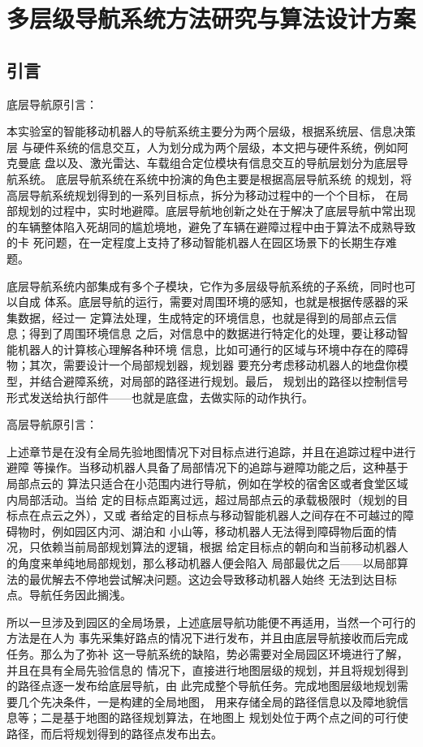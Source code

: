 \chapter{多层级导航系统方法研究与算法设计方案}

\section{引言}

底层导航原引言：

本实验室的智能移动机器人的导航系统主要分为两个层级，根据系统层、信息决策层
与硬件系统的信息交互，人为划分成为两个层级，本文把与硬件系统，例如阿克曼底
盘以及、激光雷达、车载组合定位模块有信息交互的导航层划分为底层导航系统。
底层导航系统在系统中扮演的角色主要是根据高层导航系统
的规划，将高层导航系统规划得到的一系列目标点，拆分为移动过程中的一个个目标，
在局部规划的过程中，实时地避障。底层导航地创新之处在于解决了底层导航中常出现
的车辆整体陷入死胡同的尴尬境地，避免了车辆在避障过程中由于算法不成熟导致的卡
死问题，在一定程度上支持了移动智能机器人在园区场景下的长期生存难题。

底层导航系统内部集成有多个子模块，它作为多层级导航系统的子系统，同时也可以自成
体系。底层导航的运行，需要对周围环境的感知，也就是根据传感器的采集数据，经过一
定算法处理，生成特定的环境信息，也就是得到的局部点云信息；得到了周围环境信息
之后，对信息中的数据进行特定化的处理，要让移动智能机器人的计算核心理解各种环境
信息，比如可通行的区域与环境中存在的障碍物；其次，需要设计一个局部规划器，规划器
要充分考虑移动机器人的地盘你模型，并结合避障系统，对局部的路径进行规划。最后，
规划出的路径以控制信号形式发送给执行部件——也就是底盘，去做实际的动作执行。


高层导航原引言：

上述章节是在没有全局先验地图情况下对目标点进行追踪，并且在追踪过程中进行避障
等操作。当移动机器人具备了局部情况下的追踪与避障功能之后，这种基于局部点云的
算法只适合在小范围内进行导航，例如在学校的宿舍区或者食堂区域内局部活动。当给
定的目标点距离过远，超过局部点云的承载极限时（规划的目标点在点云之外），又或
者给定的目标点与移动智能机器人之间存在不可越过的障碍物时，例如园区内河、湖泊和
小山等，移动机器人无法得到障碍物后面的情况，只依赖当前局部规划算法的逻辑，根据
给定目标点的朝向和当前移动机器人的角度来单纯地局部规划，那么移动机器人便会陷入
局部最优之后——以局部算法的最优解去不停地尝试解决问题。这边会导致移动机器人始终
无法到达目标点。导航任务因此搁浅。

所以一旦涉及到园区的全局场景，上述底层导航功能便不再适用，当然一个可行的方法是在人为
事先采集好路点的情况下进行发布，并且由底层导航接收而后完成任务。那么为了弥补
这一导航系统的缺陷，势必需要对全局园区环境进行了解，并且在具有全局先验信息的
情况下，直接进行地图层级的规划，并且将规划得到的路径点逐一发布给底层导航，由
此完成整个导航任务。完成地图层级地规划需要几个先决条件，一是构建的全局地图，
用来存储全局的路径信息以及障地貌信息等；二是基于地图的路径规划算法，在地图上
规划处位于两个点之间的可行使路径，而后将规划得到的路径点发布出去。




